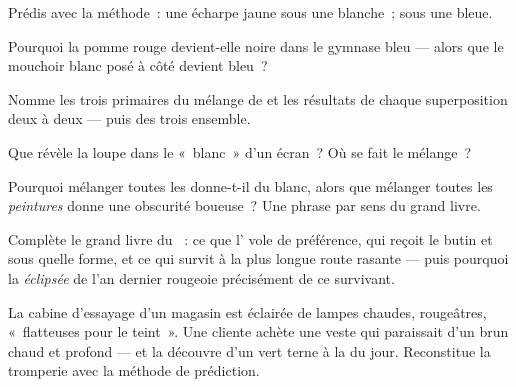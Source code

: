 \begin{exercise}[$\star$]\label{exo:g8:colors-spectra:5}
Prédis avec la méthode~: une écharpe jaune sous une  blanche~;
sous une  bleue.
\end{exercise}

\begin{exercise}[$\star$]\label{exo:g8:colors-spectra:6}
Pourquoi la pomme rouge devient-elle noire dans le gymnase bleu ---
alors que le mouchoir blanc posé à côté devient bleu~?
\end{exercise}

\begin{exercise}[$\star$]\label{exo:g8:colors-spectra:7}
Nomme les trois primaires du mélange de  et les résultats de
chaque superposition deux à deux --- puis des trois ensemble.
\end{exercise}

\begin{exercise}[$\star$]\label{exo:g8:colors-spectra:8}
Que révèle la loupe dans le «~blanc~» d'un écran~? Où se fait le
mélange~?
\end{exercise}

\begin{exercise}[$\star\star$]\label{exo:g8:colors-spectra:9}
Pourquoi mélanger toutes les \emph{} donne-t-il du blanc,
alors que mélanger toutes les \emph{peintures} donne une obscurité
boueuse~? Une phrase par sens du grand livre.
\end{exercise}

\begin{exercise}[$\star\star$]\label{exo:g8:colors-spectra:10}
Complète le grand livre du ~: ce que l' vole de
préférence, qui reçoit le butin et sous quelle forme, et ce qui
survit à la plus longue route rasante --- puis pourquoi la \emph{
éclipsée} de l'an dernier rougeoie précisément de ce survivant.
\end{exercise}

\begin{exercise}[$\star\star$]\label{exo:g8:colors-spectra:11}
La cabine d'essayage d'un magasin est éclairée de lampes chaudes,
rougeâtres, «~flatteuses pour le teint~». Une cliente achète une
veste qui paraissait d'un brun chaud et profond --- et la découvre
d'un vert terne à la  du jour. Reconstitue la tromperie avec
la méthode de prédiction.
\end{exercise}

